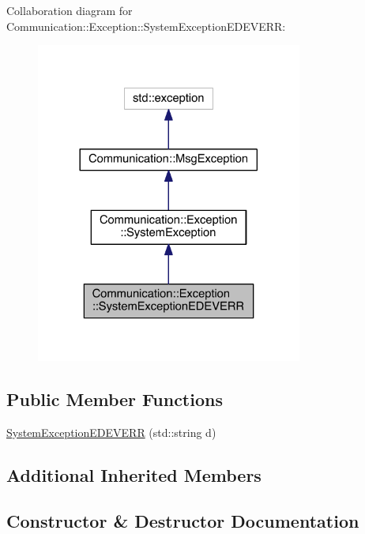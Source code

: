 Collaboration diagram for Communication\+:\+:Exception\+:\+:System\+Exception\+E\+D\+E\+V\+E\+R\+R\+:\nopagebreak
\begin{figure}[H]
\begin{center}
\leavevmode
\includegraphics[width=248pt]{class_communication_1_1_exception_1_1_system_exception_e_d_e_v_e_r_r__coll__graph}
\end{center}
\end{figure}
\subsection*{Public Member Functions}
\begin{DoxyCompactItemize}
\item 
\hyperlink{class_communication_1_1_exception_1_1_system_exception_e_d_e_v_e_r_r_abd7c1bd9a0873e00b55e7a2cc26f92fd}{System\+Exception\+E\+D\+E\+V\+E\+R\+R} (std\+::string d)
\end{DoxyCompactItemize}
\subsection*{Additional Inherited Members}


\subsection{Constructor \& Destructor Documentation}
\hypertarget{class_communication_1_1_exception_1_1_system_exception_e_d_e_v_e_r_r_abd7c1bd9a0873e00b55e7a2cc26f92fd}{}

